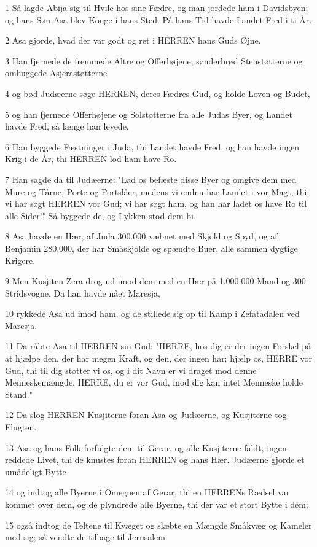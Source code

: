 \par 1 Så lagde Abija sig til Hvile hos sine Fædre, og man jordede ham i Davidsbyen; og hans Søn Asa blev Konge i hans Sted. På hans Tid havde Landet Fred i ti År.
\par 2 Asa gjorde, hvad der var godt og ret i HERREN hans Guds Øjne.
\par 3 Han fjernede de fremmede Altre og Offerhøjene, sønderbrød Stenstøtterne og omhuggede Asjerastøtterne
\par 4 og bød Judæerne søge HERREN, deres Fædres Gud, og holde Loven og Budet,
\par 5 og han fjernede Offerhøjene og Solstøtterne fra alle Judas Byer, og Landet havde Fred, så længe han levede.
\par 6 Han byggede Fæstninger i Juda, thi Landet havde Fred, og han havde ingen Krig i de År, thi HERREN lod ham have Ro.
\par 7 Han sagde da til Judæerne: "Lad os befæste disse Byer og omgive dem med Mure og Tårne, Porte og Portslåer, medens vi endnu har Landet i vor Magt, thi vi har søgt HERREN vor Gud; vi har søgt ham, og han har ladet os have Ro til alle Sider!" Så byggede de, og Lykken stod dem bi.
\par 8 Asa havde en Hær, af Juda 300.000 væbnet med Skjold og Spyd, og af Benjamin 280.000, der har Småskjolde og spændte Buer, alle sammen dygtige Krigere.
\par 9 Men Kusjiten Zera drog ud imod dem med en Hær på 1.000.000 Mand og 300 Stridsvogne. Da han havde nået Maresja,
\par 10 rykkede Asa ud imod ham, og de stillede sig op til Kamp i Zefatadalen ved Maresja.
\par 11 Da råbte Asa til HERREN sin Gud: "HERRE, hos dig er der ingen Forskel på at hjælpe den, der har megen Kraft, og den, der ingen har; hjælp os, HERRE vor Gud, thi til dig støtter vi os, og i dit Navn er vi draget mod denne Menneskemængde, HERRE, du er vor Gud, mod dig kan intet Menneske holde Stand."
\par 12 Da slog HERREN Kusjiterne foran Asa og Judæerne, og Kusjiterne tog Flugten.
\par 13 Asa og hans Folk forfulgte dem til Gerar, og alle Kusjiterne faldt, ingen reddede Livet, thi de knustes foran HERREN og hans Hær. Judæerne gjorde et umådeligt Bytte
\par 14 og indtog alle Byerne i Omegnen af Gerar, thi en HERRENs Rædsel var kommet over dem, og de plyndrede alle Byerne, thi der var et stort Bytte i dem;
\par 15 også indtog de Teltene til Kvæget og slæbte en Mængde Småkvæg og Kameler med sig; så vendte de tilbage til Jerusalem.

